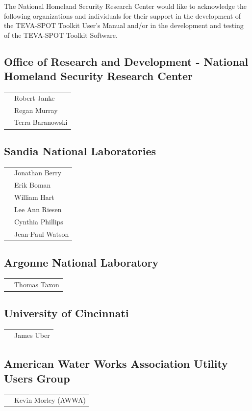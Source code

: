 The National Homeland Security Research Center would like to acknowledge 
the following organizations and individuals for their support in the
development of the TEVA-SPOT Toolkit User's Manual and/or in the development and
testing of the TEVA-SPOT Toolkit Software.

\subsection*{Office of Research and Development - National Homeland Security
  Research Center}
\begin{tabular}{ll}
& Robert Janke \\
& Regan Murray \\
& Terra Baranowski \\
\end{tabular}


\subsection*{Sandia National Laboratories}
\begin{tabular}{ll}
& Jonathan Berry \\
& Erik Boman \\
& William Hart \\
& Lee Ann Riesen \\
& Cynthia Phillips \\
& Jean-Paul Watson\\
\end{tabular}

\subsection*{Argonne National Laboratory}
\begin{tabular}{ll}
& Thomas Taxon\\
\end{tabular}

\subsection*{University of Cincinnati}
\begin{tabular}{ll}
& James Uber\\
\end{tabular}

\subsection*{American Water Works Association Utility Users Group}
\begin{tabular}{ll}
& Kevin Morley (AWWA) \\
\end{tabular}

